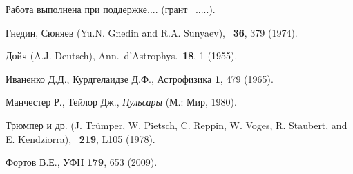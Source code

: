 \documentclass{pazh2col-win}
\begin{document}
Работа выполнена при поддержке.... (грант \textnumero\ .....).



\begin{references}

Гнедин, Сюняев
(Yu.N. Gnedin and R.A. Sunyaev),
\aap\ \textbf{36}, 379 (1974).

Дойч (A.J. Deutsch),
Ann.\ d'Astrophys.\ \textbf{18}, 1 (1955).

Иваненко Д.Д., Курдгелаидзе Д.Ф.,
Астрофизика \textbf{1}, 479 (1965).

Манчестер Р., Тейлор Дж.,
 \textit{Пульсары} (М.: Мир, 1980).

Трюмпер и др. (J. Tr\"umper, W. Pietsch, C. Reppin, W. Voges,
R. Staubert, and E. Kendziorra),
\apj\ \textbf{219}, L105 (1978).

Фортов В.Е.,
УФН \textbf{179}, 653 (2009).

\end{references}
\end{document}
